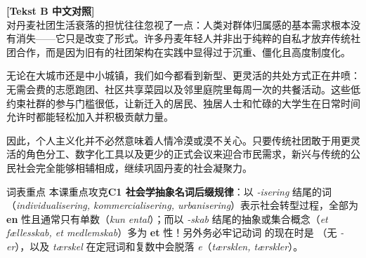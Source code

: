 \begin{transbox}
\small
\textbf{\color{NCDTeal}[Tekst B 中文对照]}\\
对丹麦社团生活衰落的担忧往往忽视了一点：人类对群体归属感的基本需求根本没有消失——它只是改变了形式。许多丹麦年轻人并非出于纯粹的自私才放弃传统社团合作，而是因为旧有的社团架构在实践中显得过于沉重、僵化且高度制度化。

无论在大城市还是中小城镇，我们如今都看到新型、更灵活的共处方式正在井喷：无需会费的志愿跑团、社区共享菜园以及邻里庭院里每周一次的共餐活动。这些低约束社群的参与门槛很低，让新迁入的居民、独居人士和忙碌的大学生在日常时间允许时都能轻松加入并积极贡献力量。

因此，个人主义化并不必然意味着人情冷漠或漠不关心。只要传统社团敢于用更灵活的角色分工、数字化工具以及更少的正式会议来迎合市民需求，新兴与传统的公民社会完全能够相辅相成，继续巩固丹麦的社会凝聚力。
\end{transbox}


\begin{tipbox}{词表重点}
本课重点攻克\textbf{C1 社会学抽象名词后缀规律}：以 \textit{-isering} 结尾的词（\textit{individualisering, kommercialisering, urbanisering}）表示社会转型过程，全部为 \textbf{en} 性且通常只有单数（\textit{kun ental}）；而以 \textit{-skab} 结尾的抽象或集合概念（\textit{et fællesskab, et medlemskab}）多为 \textbf{et} 性！另外务必牢记动词  的现在时是 （无 \textit{-er}），以及 \textit{tærskel} 在定冠词和复数中会脱落 \textit{e}（\textit{tærsklen, tærskler}）。
\end{tipbox}

